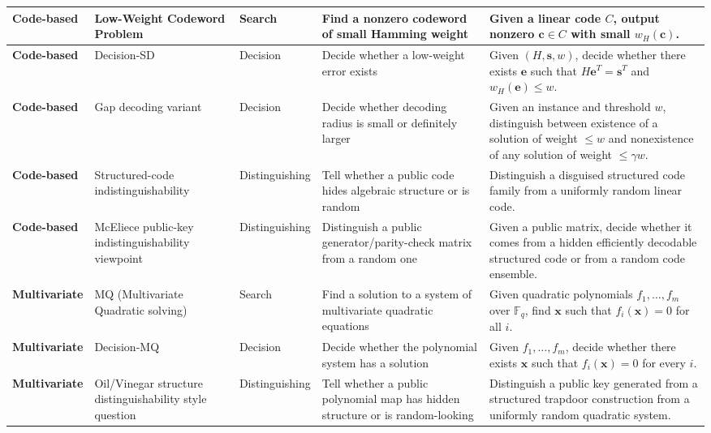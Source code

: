 \documentclass[11pt]{article}
\begin{document}
\begin{center}
\begin{tabular}{|p{1.9cm}|p{2.9cm}|p{3.3cm}|p{4.4cm}|p{4.8cm}|}
			\textbf{Code-based} 
			& Low-Weight Codeword Problem 
			& Search 
			& Find a nonzero codeword of small Hamming weight 
			& Given a linear code $C$, output nonzero $\bm c \in C$ with small $w_H(\bm c)$. \\
			\hline
			
			\textbf{Code-based} 
			& Decision-SD 
			& Decision 
			& Decide whether a low-weight error exists 
			& Given $(H,\bm s,w)$, decide whether there exists $\bm e$ such that $H\bm e^T=\bm s^T$ and $w_H(\bm e)\le w$. \\
			\hline
			
			\textbf{Code-based} 
			& Gap decoding variant 
			& Decision 
			& Decide whether decoding radius is small or definitely larger 
			& Given an instance and threshold $w$, distinguish between existence of a solution of weight $\le w$ and nonexistence of any solution of weight $\le \gamma w$. \\
			\hline
			
			\textbf{Code-based} 
			& Structured-code indistinguishability 
			& Distinguishing 
			& Tell whether a public code hides algebraic structure or is random 
			& Distinguish a disguised structured code family from a uniformly random linear code. \\
			\hline
			
			\textbf{Code-based} 
			& McEliece public-key indistinguishability viewpoint 
			& Distinguishing 
			& Distinguish a public generator/parity-check matrix from a random one 
			& Given a public matrix, decide whether it comes from a hidden efficiently decodable structured code or from a random code ensemble. \\
			\hline
			
			\textbf{Multivariate} 
			& MQ (Multivariate Quadratic solving) 
			& Search 
			& Find a solution to a system of multivariate quadratic equations 
			& Given quadratic polynomials $f_1,\dots,f_m$ over $\mathbb{F}_q$, find $\bm x$ such that $f_i(\bm x)=0$ for all $i$. \\
			\hline
			
			\textbf{Multivariate} 
			& Decision-MQ 
			& Decision 
			& Decide whether the polynomial system has a solution 
			& Given $f_1,\dots,f_m$, decide whether there exists $\bm x$ such that $f_i(\bm x)=0$ for every $i$. \\
			\hline
			
			\textbf{Multivariate} 
			& Oil/Vinegar structure distinguishability style question 
			& Distinguishing 
			& Tell whether a public polynomial map has hidden structure or is random-looking 
			& Distinguish a public key generated from a structured trapdoor construction from a uniformly random quadratic system. \\
			\hline
			

\end{tabular}
\end{center}
\end{document}
